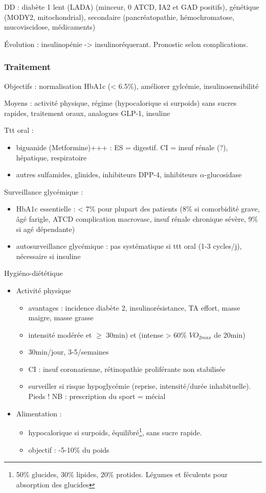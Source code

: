 \documentclass[11pt]{article}
\begin{document}
DD : diabète 1 lent (LADA) (minceur, 0 ATCD, IA2 et GAD positifs), génétique
(MODY2, mitochondrial), secondaire (pancréatopathie, hémochromatose,
mucoviscidose, médicaments)

Évolution : insulinopénie -> insulinoréquerant. Pronostic selon complications.

\subsubsection{Traitement}
\label{sec:orgaab319b}
Objectifs : normalisation HbA1c (< 6.5\%), améliorer gylcémie, insulinosensibilité

Moyens  : activité physique, régime (hypocalorique si surpoids) sans sucres
rapides, traitement oraux, analogues GLP-1, insuline

Ttt oral :
\begin{itemize}
\item biguanide (Metformine)+++ : ES = digestif. CI = insuf rénale (?), hépatique, respiratoire
\item autres sulfamides, glinides, inhibiteurs DPP-4, inhibiteurs \(\alpha\)-glucosidase
\end{itemize}

Surveillance glycémique :
\begin{itemize}
\item HbA1c essentielle : < 7\% pour plupart des patients (8\% si comorbidité grave,
âgé farigle, ATCD complication macrovasc, insuf rénale chronique sévère, 9\% si
agé dépendante)
\item autosurveillance glycémique : pas systématique si ttt oral (1-3 cycles/j),
nécessaire si insuline
\end{itemize}

Hygiéno-diététique
\begin{itemize}
\item Activité physique 
\begin{itemize}
\item avantages : \dec incidence diabète 2, \inc insulinorésistance, \inc TA
effort, \inc masse maigre, \dec masse grasse
\item intensité modérée et \(\ge\) 30min) et (intense > 60\% \(VO_{2max}\) de 20min)
\item 30min/jour, 3-5/semaines
\item CI : insuf coronarienne, rétinopathie proliférante non stabilisée
\item surveiller si risque hypoglycémie (reprise, intensité/durée
inhabituelle). Pieds ! NB : prescription du sport = mécial
\end{itemize}
\item Alimentation : 
\begin{itemize}
\item hypocalorique si surpoids, équilibré\footnote{50\% glucides, 30\% lipides, 20\% protides. Légumes et féculents pour \inc
absorption des glucides}, sans sucre rapide.
\item objectif : -5-10\% du poids
\end{itemize}
\end{itemize}
\end{document}
